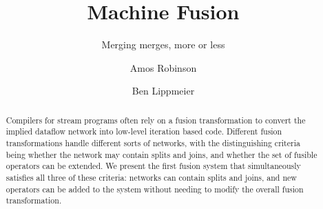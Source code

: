 \documentclass[sigconf,review]{acmart}\settopmatter{printfolios=true}
\begin{document}
\title{Machine Fusion}
\subtitle{Merging merges, more or less}

\author{Amos Robinson}

\author{Ben Lippmeier}

\makeatactive
\begin{abstract}
Compilers for stream programs often rely on a fusion transformation to convert the implied dataflow network into low-level iteration based code. Different fusion transformations handle different sorts of networks, with the distinguishing criteria being whether the network may contain splits and joins, and whether the set of fusible operators can be extended. We present the first fusion system that simultaneously satisfies all three of these criteria: networks can contain splits and joins, and new operators can be added to the system without needing to modify the overall fusion transformation.
\end{abstract}


\maketitle






% 


% 


% 
\end{document}

